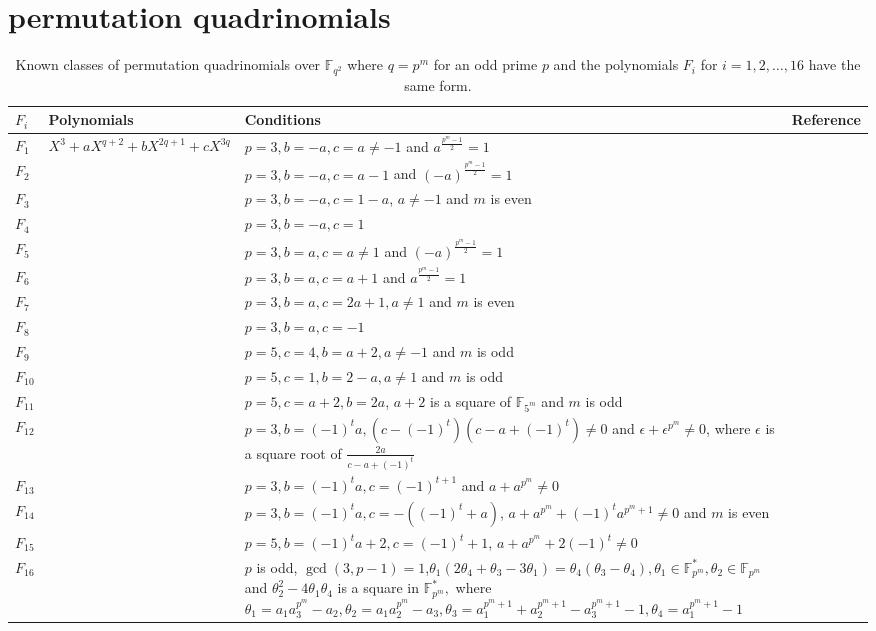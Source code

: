 \documentclass[12pt]{amsart}
\numberwithin{equation}{section}
\theoremstyle{definition}
\newcommand{\F}{\mathbb F}
\begin{document}
 
\appendix
\section{permutation quadrinomials}\label{quad}
 \begin{longtable}{|m{2em}|m{17em}|m{11em}|m{4em}|}
 \caption{Known classes of permutation quadrinomials over $\F_{q^2}$ where $q=p^m$ for an odd prime $p$ and the polynomials $F_i$ for $i=1,2,\dots, 16$ have the same form.\label{Table0}}
 \\
 \hline
$F_i$& Polynomials & Conditions & Reference\\
\hline
$F_1$& $X^3 + aX^{q+2}+bX^{2q+1}+cX^{3q}$  & $p = 3, b = -a, c = a \neq -1$ and $a^{\frac{p^m-1}{2}}=1$ & ~\cite{Gupta20}\\
\hline
 $F_2$&   & $p = 3, b = -a, c = a -1$ and $(-a)^{\frac{p^m-1}{2}}=1$ & ~\cite{Gupta20}\\
\hline
 $F_3$&   & $p = 3, b = -a, c = 1-a$, $a \neq -1$ and $m$ is even & ~\cite{Gupta20}\\
 \hline
  $F_4$&   & $p = 3, b = -a, c = 1$ & ~\cite{Gupta20}\\
  \hline
  $F_5$&    & $p = 3, b = a, c = a \neq 1$ and $(-a)^{\frac{p^m-1}{2}}=1$ & ~\cite{Gupta20}\\
\hline
$F_6$&    & $p = 3, b = a, c = a+1$ and $a^{\frac{p^m-1}{2}}=1$ & ~\cite{Gupta20}\\
\hline
$F_7$&    & $p = 3, b = a, c = 2a+1, a\neq1$ and $m$ is even  & ~\cite{Gupta20}\\
\hline
$F_8$&   & $p = 3, b = a, c =- 1$ & ~\cite{Gupta20}\\
\hline
$F_9$&    & $p = 5, c=4, b = a+2, a \neq -1$ and $m$ is odd & ~\cite{Gupta20}\\
\hline
$F_{10}$&   & $p = 5, c=1, b = 2-a, a \neq 1$ and $m$ is odd & ~\cite{Gupta20}\\
\hline
$F_{11}$&   & $p = 5, c=a+2, b = 2a$, $a+2$ is a square of $\F_{5^m}$ and $m$ is odd & ~\cite{Gupta20}\\
\hline
$F_{12}$&    & $p = 3, b = (-1)^t a, (c - (-1)^t)(c-a + (-1)^t) \neq 0$ and $\epsilon + \epsilon^{p^m} \neq 0$, where $\epsilon$ is a square root of $\frac{2a}{c-a+(-1)^t}$ & ~\cite{Gupta22}\\
\hline
$F_{13}$&    & $p = 3, b = (-1)^t a, c=(-1)^{t+1}$ and $a+a^{p^m} \neq 0$ & ~\cite{Gupta22}\\
\hline
$F_{14}$&    & $p = 3, b = (-1)^t a, c=-((-1)^{t}+a)$, $a+a^{p^m}+(-1)^{t}a^{p^m+1} \neq 0$ and $m$ is even & ~\cite{Gupta22}\\
\hline
$F_{15}$&   & $p = 5, b = (-1)^t a+2, c=(-1)^{t}+1$, $a+a^{p^m}+2(-1)^{t} \neq 0$ & ~\cite{Gupta22}\\
\hline 
$F_{16}$&    & $p$ is odd, $\gcd(3,p-1)=1$,$\theta_1(2\theta_4+\theta_3-3\theta_1)=\theta_4(\theta_3-\theta_4),\theta_1 \in \F_{p^m}^{*},\theta_2 \in \F_{p^m}$ and $\theta_2^2-4\theta_1\theta_4$ is a square in $\F_{p^m}^{*},$ where $\theta_1=a_1a_3^{p^m}-a_2,\theta_2= a_1a_2^{p^m}-a_3,\theta_3=a_1^{p^m+1}+a_2^{p^m+1}-a_3^{p^m+1}-1,\theta_4=a_1^{p^m+1}-1$ & ~\cite{Chen}\\
\hline 


\end{longtable}
\end{document}
